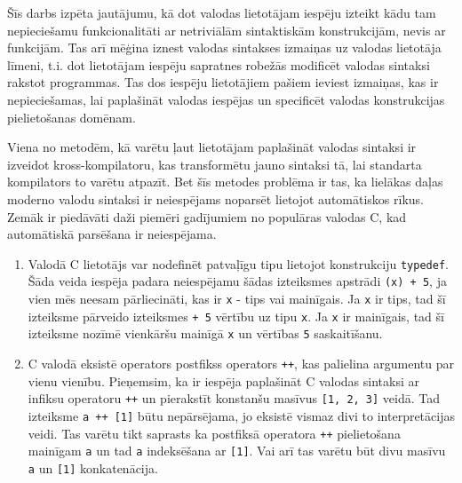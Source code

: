 

Šīs darbs izpēta jautājumu, kā dot valodas lietotājam iespēju izteikt kādu tam nepieciešamu funkcionalitāti ar netriviālām sintaktiskām konstrukcijām, nevis ar funkcijām. Tas arī mēģina iznest valodas sintakses izmaiņas uz valodas lietotāja līmeni, t.i. dot lietotājam iespēju sapratnes robežās modificēt valodas sintaksi rakstot programmas. Tas dos iespēju lietotājiem pašiem ieviest izmaiņas, kas ir nepieciešamas, lai paplašināt valodas iespējas un specificēt valodas konstrukcijas pielietošanas domēnam.

Viena no metodēm, kā varētu ļaut lietotājam paplašināt valodas sintaksi ir izveidot kross\--kom\-pi\-la\-to\-ru, kas transformētu jauno sintaksi tā, lai standarta kompilators to varētu atpazīt. Bet šīs metodes problēma ir tas, ka lielākas daļas moderno valodu sintaksi ir neiespējams noparsēt lietojot automātiskos rīkus. Zemāk ir piedāvāti daži piemēri gadījumiem no populāras valodas C, kad automātiskā parsēšana ir neiespējama.

\begin{enumerate}
\item
Valodā C lietotājs var nodefinēt patvaļīgu tipu lietojot konstrukciju \verb|typedef|. Šāda veida iespēja padara neiespējamu šādas izteiksmes apstrādi \verb|(x) + 5|, ja vien mēs neesam pārliecināti, kas ir \verb|x| - tips vai mainīgais. Ja \verb|x| ir tips, tad šī izteiksme pārveido izteiksmes \verb|+ 5| vērtību uz tipu \verb|x|. Ja \verb|x| ir mainīgais, tad šī izteiksme nozīmē vienkāršu mainīgā \verb|x| un vērtības \verb|5| saskaitīšanu. 
\item
C valodā eksistē operators postfikss operators \verb|++|, kas palielina argumentu par vienu vienību. Pieņemsim, ka ir iespēja paplašināt C valodas sintaksi ar infiksu operatoru \verb|++| un pierakstīt konstanšu masīvus \verb|[1, 2, 3]| veidā. Tad izteiksme \verb|a ++ [1]| būtu nepārsējama, jo eksistē vismaz divi to interpretācijas veidi. Tas varētu tikt saprasts ka postfiksā operatora \verb|++| pielietošana mainīgam \verb|a| un tad \verb|a| indeksēšana ar \verb|[1]|. Vai arī tas varētu būt divu masīvu \verb|a| un \verb|[1]| konkatenācija.
\end{enumerate}

